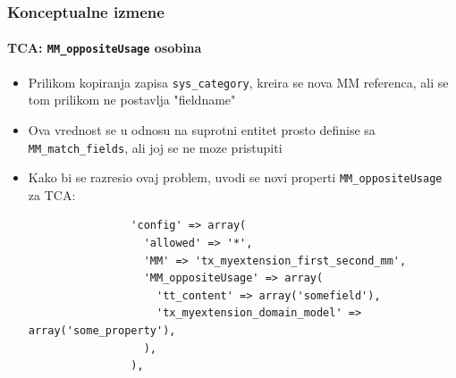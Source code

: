 \begin{frame}[fragile]
	\frametitle{Konceptualne izmene}
	\framesubtitle{TCA: \texttt{MM\_oppositeUsage} osobina}

	\lstset{
		basicstyle=\tiny\ttfamily
	}

	\begin{itemize}
		\item Prilikom kopiranja zapisa \texttt{sys\_category}, kreira se nova MM referenca, ali se tom prilikom ne postavlja "fieldname"
		\item Ova vrednost se u odnosu na suprotni entitet prosto definise sa \texttt{MM\_match\_fields}, ali joj se ne moze pristupiti
		\item Kako bi se razresio ovaj problem, uvodi se novi properti \texttt{MM\_oppositeUsage} za TCA:

			\begin{lstlisting}
				'config' => array(
				  'allowed' => '*',
				  'MM' => 'tx_myextension_first_second_mm',
				  'MM_oppositeUsage' => array(
				    'tt_content' => array('somefield'),
				    'tx_myextension_domain_model' => array('some_property'),
				  ),
				),
			\end{lstlisting}

	\end{itemize}

\end{frame}


